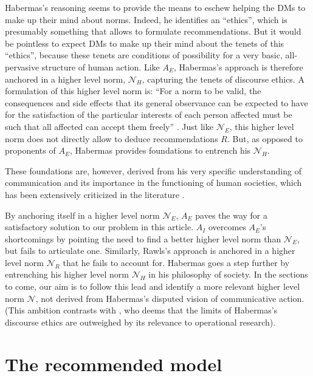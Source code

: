 \documentclass[preprint, french, english, 11pt, authoryear]{elsarticle}%
\newcommand{\adv}{\mathscr{N}}
\begin{document}
Habermas's reasoning seems to provide the means to eschew helping the \acp{DM} to make up their mind about norms. Indeed, he identifies an “ethics”, which is presumably something that allows to formulate recommendations. But it would be pointless to expect \acp{DM} to make up their mind about the tenets of this “ethics”, because these tenets are conditions of possibility for a very basic, all-pervasive structure of human action. Like $A_E$, Habermas's approach is therefore anchored in a higher level norm, $\mathscr{N}_{H}$, capturing the tenets of discourse ethics. A formulation of this higher level norm is: “For a norm to be valid, the consequences and side effects that its general observance can be expected to have for the satisfaction of the particular interests of each person affected must be such that all affected can accept them freely” \citep{habermas_moralbewustsein_1983}. Just like $\mathscr{N}_E$, this higher level norm does not directly allow to deduce recommendations $R$. But, as opposed to proponents of $A_E$, Habermas provides foundations to entrench his $\mathscr{N}_{H}$. 

These foundations are, however, derived from his very specific understanding of communication and its importance in the functioning of human societies, which has been extensively criticized in the literature \citep{heath_communicative_2001,honneth_kritik_1985,benhabib_situating_1992}. 

By anchoring itself in a higher level norm $\mathscr{N}_E$, $A_E$ paves the way for a satisfactory solution to our problem in this article. $A_I$ overcomes $A_E$'s shortcomings by pointing the need to find a better higher level norm than $\mathscr{N}_E$, but fails to articulate one. Similarly, Rawls's approach is anchored in a higher level norm $\mathscr{N}_{R}$ that he fails to account for. Habermas goes a step further by entrenching his higher level norm $\mathscr{N}_{H}$ in his philosophy of society. In the sections to come, our aim is to follow this lead and identify a more relevant higher level norm $\adv$, not derived from Habermas's disputed vision of communicative action. (This ambition contrasts with \citet{mingers_ethics_2011}, who deems that the limits of Habermas's discourse ethics are outweighed by its relevance to operational research).%

\section{The recommended model}
\label{sec:recomm}
\end{document}
